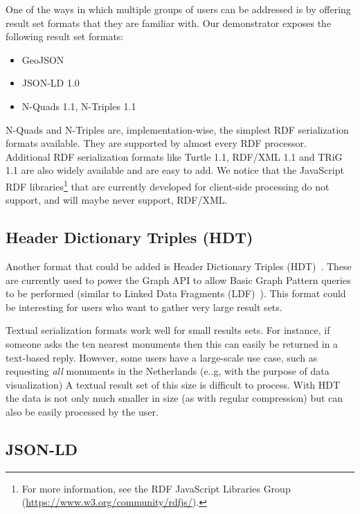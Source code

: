 \documentclass[a4paper]{scrartcl}
\begin{document}
One of the ways in which multiple groups of users can be addressed is
by offering result set formats that they are familiar with.  Our
demonstrator exposes the following result set formats:

\begin{itemize}

\item GeoJSON

\item JSON-LD 1.0

\item N-Quads 1.1, N-Triples 1.1

\end{itemize}

N-Quads and N-Triples are, implementation-wise, the simplest RDF
serialization formats available.  They are supported by almost every
RDF processor.  Additional RDF serialization formats like Turtle 1.1,
RDF/XML 1.1 and TRiG 1.1 are also widely available and are easy to
add.  We notice that the JavaScript RDF libraries\footnote{For more
  information, see the RDF JavaScript Libraries Group
  (\url{https://www.w3.org/community/rdfjs/}).} that are currently
developed for client-side processing do not support, and will maybe
never support, RDF/XML.


\subsection{Header Dictionary Triples (HDT)}
\label{sec:hdt}

Another format that could be added is Header Dictionary Triples
(HDT)~\cite{Fernandez2013}.  These are currently used to power the
Graph API to allow Basic Graph Pattern queries to be performed
(similar to Linked Data Fragments (LDF)~\cite{Verborgh2014}).  This
format could be interesting for users who want to gather very large
result sets.

Textual serialization formats work well for small results sets.  For
instance, if someone asks the ten nearest monuments then this can
easily be returned in a text-based reply.  However, some users have a
large-scale use case, such as requesting \emph{all} monuments in the
Netherlands (e..g, with the purpose of data visualization) A textual
result set of this size is difficult to process.  With HDT the data is
not only much smaller in size (as with regular compression) but can
also be easily processed by the user.


\subsection{JSON-LD}
\label{sec:jsonld}
\end{document}
